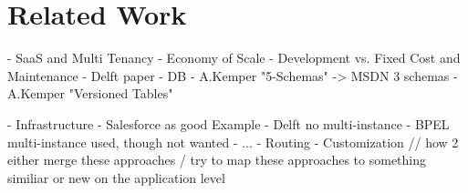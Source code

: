 \section{Related Work}
\label{sec:relatedwork}

- SaaS and Multi Tenancy
  - Economy of Scale
    - Development vs. Fixed Cost and Maintenance
    - Delft paper
- DB
  - A.Kemper "5-Schemas" -> MSDN 3 schemas
  - A.Kemper "Versioned Tables"

- Infrastructure
  - Salesforce as good Example
  - Delft no multi-instance
  - BPEL multi-instance used, though not wanted
- ...
  - Routing
  - Customization // how 2 either merge these approaches / try to map these approaches to something similiar or new on the application level